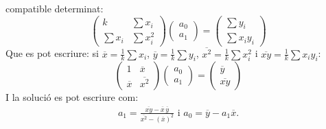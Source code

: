 \documentclass[
  11pt,
]{book}
\numberwithin{dummy}{section}
\theoremstyle{maincolornumbox}
\theoremstyle{blacknumex}
\theoremstyle{blacknumbox}
\theoremstyle{maincolornum}
\begin{document}
compatible determinat: \[\begin{pmatrix}
k & \sum x_i \\ \sum x_i & \sum x_i^2 
\end{pmatrix}
\begin{pmatrix} a_0 \\ a_1 \end{pmatrix} = 
\begin{pmatrix} \sum y_i \\ \sum x_iy_i \end{pmatrix}\] Que es pot
escriure: si \(\overline x = \frac{1}{k} \sum x_i\),
\(\overline y=\frac{1}{k} \sum y_i\),
\(\overline {x^2}= \frac{1}{k} \sum x_i^2\) i
\(\overline {xy}=  \frac{1}{k} \sum x_iy_i\): \[\begin{pmatrix}
1 & \overline x \\ \overline x & \overline{x^2} 
\end{pmatrix}
\begin{pmatrix} a_0 \\ a_1 \end{pmatrix} = 
\begin{pmatrix}  \overline y \\ \overline{xy} \end{pmatrix}\] I la
solució es pot escriure com: \begin{align*}
\label{eq:recta-reg}
a_1=\frac{\overline{xy} - \overline x \, \overline y}{\overline{x^2} - (\overline x)^2}
\text{ i } 
a_0= \overline y - a_1 \overline x .
\end{align*}
\end{document}
